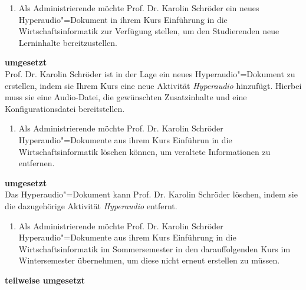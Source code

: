 \begin{enumerate}[leftmargin=1.11cm,label=US-\arabic*:,ref=US-\arabic*]
\item \label{US-Admin-Erstellen-Eval} Als Administrierende möchte Prof. Dr. Karolin Schröder ein neues Hyperaudio"=Dokument in ihrem Kurs \glqq Einführung in die Wirtschaftsinformatik\grqq{} zur Verfügung stellen, um den Studierenden neue Lerninhalte bereitzustellen.
\end{enumerate}
\vspace{-0.25cm}
\textbf{umgesetzt}\\
Prof. Dr. Karolin Schröder ist in der Lage ein neues Hyperaudio"=Dokument zu erstellen, indem sie Ihrem Kurs eine neue Aktivität \textit{Hyperaudio} hinzufügt. Hierbei muss sie eine Audio-Datei, die gewünschten Zusatzinhalte und eine Konfigurationsdatei bereitstellen.
\vspace{0.25cm}
\begin{enumerate}[resume*]
\item \label{US-Admin-Loeschen-Eval} Als Administrierende möchte Prof. Dr. Karolin Schröder Hyperaudio"=Dokumente aus ihrem Kurs \glqq Einführun in die Wirtschaftsinformatik\grqq{} löschen können, um veraltete Informationen zu entfernen.
\end{enumerate}
\vspace{-0.1cm}
\textbf{umgesetzt}\\
Das Hyperaudio"=Dokument kann Prof. Dr. Karolin Schröder löschen, indem sie die dazugehörige Aktivität \textit{Hyperaudio} entfernt.
\vspace{0.25cm}
\begin{enumerate}[resume*]
\item \label{US-Admin-Semester-Eval} Als Administrierende möchte Prof. Dr. Karolin Schröder Hyperaudio"=Dokumente aus ihrem Kurs \glqq Einführung in die Wirtschaftsinformatik\grqq{} im Sommersemester in den darauffolgenden Kurs im Wintersemester übernehmen, um diese nicht erneut erstellen zu müssen.
\end{enumerate}
\vspace{-0.1cm}
\textbf{teilweise umgesetzt}\\
